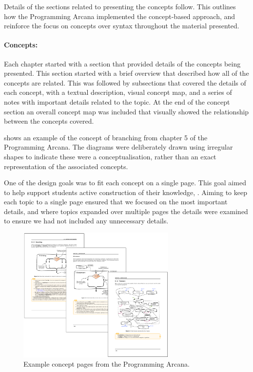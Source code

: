 Details of the sections related to presenting the concepts follow. This outlines how the Programming Arcana implemented the concept-based approach, and reinforce the focus on concepts over syntax throughout the material presented. 

\clearpage
\paragraph{Concepts:} %
\label{par:concepts}

Each chapter started with a section that provided details of the concepts being presented. This section started with a brief overview that described how all of the concepts are related. This was followed by subsections that covered the details of each concept, with a textual description, visual concept map, and a series of notes with important details related to the topic. At the end of the concept section an overall concept map was included that visually showed the relationship between the concepts covered. 

 shows an example of the concept of branching from chapter 5 of the Programming Arcana. The diagrams were deliberately drawn using irregular shapes to indicate these were a conceptualisation, rather than an exact representation of the associated concepts.

One of the design goals was to fit each concept on a single page. This goal aimed to help support students active construction of their knowledge, . Aiming to keep each topic to a single page ensured that we focused on the most important details, and where topics expanded over multiple pages the details were examined to ensure we had not included any unnecessary details.

\begin{figure}[h]
  \centering
  \includegraphics[width=0.7\textwidth]{ArcanaConcepts}
  \caption{Example concept pages from the Programming Arcana.}
  \label{fig:arcana_concepts}
\end{figure}


